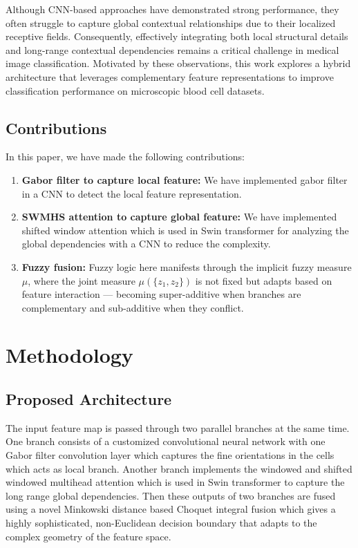 \documentclass[preprint,12pt]{elsarticle}
\begin{document}
Although CNN-based approaches have demonstrated strong performance, they often struggle to capture global contextual relationships due to their localized receptive fields. Consequently, effectively integrating both local structural details and long-range contextual dependencies remains a critical challenge in medical image classification. Motivated by these observations, this work explores a hybrid architecture that leverages complementary feature representations to improve classification performance on microscopic blood cell datasets.

\FloatBarrier
\subsection{Contributions}
In this paper, we have made the following contributions:
\begin{enumerate}
    \item\textbf{Gabor filter to capture local feature: } We have implemented gabor filter in a CNN to detect the local feature representation.
    \item\textbf{SWMHS attention to capture global feature: } We have implemented shifted window attention which is used in Swin transformer for analyzing the global dependencies with a CNN to reduce the complexity.
    \item\textbf{Fuzzy fusion: }Fuzzy logic here manifests through the implicit fuzzy measure $\mu$, where the joint measure $\mu(\{z_1, z_2\})$
    is not fixed but adapts based on feature interaction — becoming super-additive when branches are complementary and sub-additive when they conflict.  
\end{enumerate}



\FloatBarrier
\section{Methodology}

\FloatBarrier
\subsection{Proposed Architecture}

The input feature map is passed through two parallel branches at the same time. One branch consists of a customized convolutional neural network with one Gabor filter convolution layer which captures the fine orientations in the cells which acts as local branch. Another branch implements the windowed and shifted windowed multihead attention which is used in Swin transformer to capture the long range global dependencies. Then these outputs of two branches are fused using a novel Minkowski distance based Choquet integral fusion which gives a highly sophisticated, non-Euclidean decision boundary that adapts to the complex geometry of the feature space.
\end{document}
